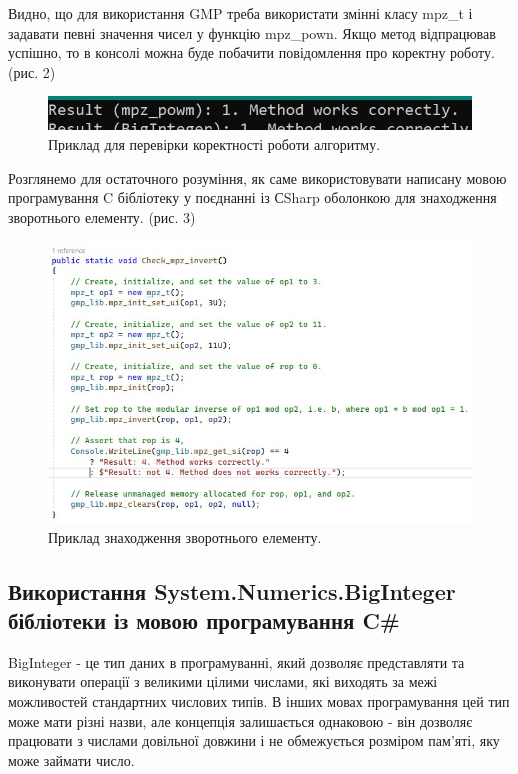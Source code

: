 Видно, що для використання GMP треба використати змінні класу mpz\_t і задавати певні значення чисел у функцію mpz\_pown. Якщо метод відпрацював успішно, то в консолі можна буде побачити повідомлення про коректну роботу. (рис. 2)

\begin{figure}[!h]
     \centering
     \includegraphics[scale = 1]{../IMAGES/image_02_c_sharp_lab_02.jpg}
     \caption{Приклад для перевірки коректності роботи алгоритму.}
     \label{fig:}
\end{figure}

Розглянемо для остаточного розуміння, як саме використовувати написану мовою програмування C бібліотеку у поєднанні із СSharp оболонкою для знаходження зворотнього елементу. (рис. 3)

\begin{figure}[!h]
     \centering
     \includegraphics[scale = 1]{../IMAGES/image_05_c_sharp_lab_05.jpg}
     \caption{Приклад знаходження зворотнього елементу.}
     \label{fig_05:}
\end{figure}

\newpage
\par

\subsection{Використання System.Numerics.BigInteger бібліотеки із мовою програмування C\#}

BigInteger - це тип даних в програмуванні, який дозволяє представляти та виконувати операції з великими цілими числами, які виходять за межі можливостей стандартних числових типів. В інших мовах програмування цей тип може мати різні назви, але концепція залишається однаковою - він дозволяє працювати з числами довільної довжини і не обмежується розміром пам'яті, яку може займати число.

